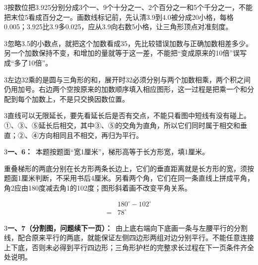 \documentclass[multi=snippet,border={5bp 20bp 5bp 5bp}]{standalone}
\newenvironment{snippet}[3]{\begin{minipage}{#1bp}\color{answerred}\fontsize{#2}{#3}\selectfont\raggedright}{\end{minipage}}
\begin{document}
\begin{snippet}{505}{11.5}{14}\begin{multicols}{3}\raggedcolumns 按数位把3.925分别分成3个一、9个十分之一、2个百分之一和5个千分之一，不能把末位5看成百分之一。画数线标记前，先认清3.9到4.0被分成20小格，每格0.005；3.925比3.9多0.025，应从3.9向右数5小格，让三角形顶点对准刻度。\end{multicols}\end{snippet}
\begin{snippet}{505}{11.5}{14}\begin{multicols}{3}\raggedcolumns 忽略3.5的小数点，就把这个加数看成35，先比较错误加数与正确加数相差多少。另一个加数保持不变，和增加的量就等于这一差，不能把“变成原来的10倍”误写成“多了10倍”。\end{multicols}\end{snippet}
\begin{snippet}{505}{11.5}{14}\begin{multicols}{3}\raggedcolumns 左边32乘的是圆与三角形的和，展开时32必须分别与两个加数相乘，两个积之间仍用加号。右边两个空按原来的加数顺序填入相应图形，这一过程是把乘一个和分配到每个加数上，不是只交换因数位置。\end{multicols}\end{snippet}
\begin{snippet}{505}{11.5}{14}\begin{multicols}{3}\raggedcolumns 直线可以无限延长，要先看延长后是否有交点，不能只看图中短线有没有碰上。①、③、⑤延长后相交，其中③、⑤的交角为直角，所以它们同时属于相交和垂直；②、④方向相同且不相交，再归为平行。\end{multicols}\end{snippet}
\begin{snippet}{505}{11.5}{14}\begin{multicols}{3}\raggedcolumns \textbf{一、6：}\ 本题按题面“宽1厘米”，梯形高等于长方形宽，填1厘米。\par 重叠梯形的两底分别在长方形两条长边上，它们的垂直距离就是长方形的宽，须按题面1厘米判断，不采用书后4厘米。另看两个角，它们在同一条直线上拼成平角，角2应由180度减去角1的102度；图形斜着画不改变平角关系。\par \[\begin{aligned}&180^\circ-102^\circ\\={}&78^\circ\end{aligned}\]\end{multicols}\end{snippet}
\begin{snippet}{505}{11.5}{14}\begin{multicols}{3}\raggedcolumns \textbf{一、7（分割图，问题续下一页）：}\ 由上底右端向下底画一条与左腰平行的分割线，配合原来平行的两底，就能保证左侧四边形两组对边分别平行。不能任意连接上下底，否则未必得到平行四边形；三角形护栏的完整求长过程在下一页条件齐全处说明。\end{multicols}\end{snippet}
\end{document}
